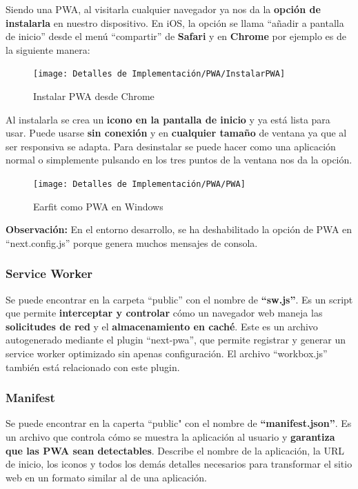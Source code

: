 \documentclass[12pt,twoside,titlepage]{report}
\begin{document}
Siendo una PWA, al visitarla cualquier navegador ya nos da la \textbf{opción de instalarla} en nuestro dispositivo. En iOS, la opción se llama ``añadir a pantalla de inicio'' desde el menú ``compartir'' de \textbf{Safari} y en \textbf{Chrome} por ejemplo es de la siguiente manera:

\begin{figure}[H]
    \centering
    \texttt{[image: Detalles de Implementación/PWA/InstalarPWA]}
    \label{fig:InstalarPWA}
    \caption{Instalar PWA desde Chrome}
\end{figure}

Al instalarla se crea un \textbf{icono en la pantalla de inicio} y ya está lista para usar. Puede usarse \textbf{sin conexión} y en \textbf{cualquier tamaño} de ventana ya que al ser responsiva se adapta. Para desinstalar se puede hacer como una aplicación normal o simplemente pulsando en los tres puntos de la ventana nos da la opción.

\begin{figure}[H]
    \centering
    \texttt{[image: Detalles de Implementación/PWA/PWA]}
    \label{fig:PWA}
    \caption{Earfit como PWA en Windows}
\end{figure}

\textbf{Observación:} En el entorno desarrollo, se ha deshabilitado la opción de PWA en ``next.config.js'' porque genera muchos mensajes de consola.

\subsubsection{Service Worker}
Se puede encontrar en la carpeta ``public'' con el nombre de \textbf{``sw.js''}. Es un script que permite \textbf{interceptar y controlar} cómo un navegador web maneja las \textbf{solicitudes de red} y el \textbf{almacenamiento en caché}. Este es un archivo autogenerado mediante el plugin ``next-pwa'', que permite registrar y generar un service worker optimizado sin apenas configuración. El archivo ``workbox.js'' también está relacionado con este plugin.

\subsubsection{Manifest}
Se puede encontrar en la caperta ``public" con el nombre de \textbf{``manifest.json''}. Es un archivo que controla cómo se muestra la aplicación al usuario y \textbf{garantiza que las PWA sean detectables}. Describe el nombre de la aplicación, la URL de inicio, los iconos y todos los demás detalles necesarios para transformar el sitio web en un formato similar al de una aplicación. 
\end{document}
